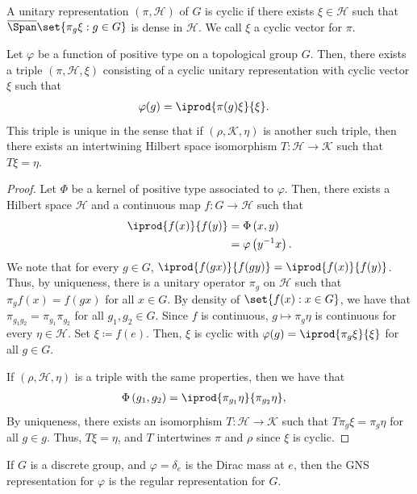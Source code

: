 \documentclass[10pt]{mypackage}
\renewcommand{\coloneq}{\coloneqq}
\begin{document}
\begin{definition}
  A unitary representation $\left( \pi,\mathscr{H} \right)$ of $G$ is cyclic if there exists $\xi\in \mathscr{H}$ such that $ \overline{\Span}\set{\pi_g\xi : g\in G} $ is dense in $ \mathscr{H} $. We call $\xi$ a cyclic vector for $\pi$.
\end{definition}
\begin{theorem}
  Let $\varphi$ be a function of positive type on a topological group $G$. Then, there exists a triple $\left( \pi,\mathscr{H},\xi \right)$ consisting of a cyclic unitary representation with cyclic vector $\xi$ such that
  \begin{align*}
    \varphi(g) &= \iprod{\pi(g)\xi}{\xi}.
  \end{align*}
  This triple is unique in the sense that if $\left( \rho,\mathscr{K},\eta \right)$ is another such triple, then there exists an intertwining Hilbert space isomorphism $T\colon \mathscr{H}\to \mathscr{K}$ such that $T\xi = \eta$.
\end{theorem}
\begin{proof}
  Let $\Phi$ be a kernel of positive type associated to $\varphi$. Then, there exists a Hilbert space $ \mathscr{H} $ and a continuous map $f\colon G\to \mathscr{H}$ such that
  \begin{align*}
    \iprod{f(x)}{f(y)} &= \Phi\left( x,y \right)\\
                       &= \varphi\left( y^{-1}x \right).
  \end{align*}
  We note that for every $g\in G$, $ \iprod{f(gx)}{f(gy)} = \iprod{f(x)}{f(y)} $. Thus, by uniqueness, there is a unitary operator $\pi_g$ on $ \mathscr{H} $ such that $\pi_gf(x) = f(gx)$ for all $x\in G$. By density of $\set{f(x) : x\in G}$, we have that $\pi_{g_1g_2} = \pi_{g_1}\pi_{g_2}$ for all $g_1,g_2\in G$. Since $f$ is continuous, $g\mapsto \pi_g\eta$ is continuous for every $\eta\in \mathscr{H}$. Set $\xi\coloneq f(e)$. Then, $\xi$ is cyclic with $\varphi(g) = \iprod{\pi_g\xi}{\xi}$ for all $g\in G$.

  If $\left( \rho,\mathscr{H},\eta \right)$ is a triple with the same properties, then we have that
  \begin{align*}
    \Phi\left( g_1,g_2 \right) &= \iprod{\pi_{g_1}\eta}{\pi_{g_2}\eta},
  \end{align*}
  By uniqueness, there exists an isomorphism $T\colon \mathscr{H}\to \mathscr{K}$ such that $T\pi_g\xi = \pi_g\eta$ for all $g\in g$. Thus, $T\xi = \eta$, and $T$ intertwines $\pi$ and $\rho$ since $\xi$ is cyclic.
\end{proof}
\begin{example}
  If $G$ is a discrete group, and $\varphi = \delta_e$ is the Dirac mass at $e$, then the GNS representation for $\varphi$ is the regular representation for $G$.
\end{example}
\end{document}
